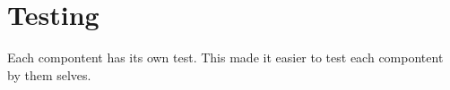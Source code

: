 \section{Testing}
Each compontent has its own test. This made it easier to test each compontent by them selves.
